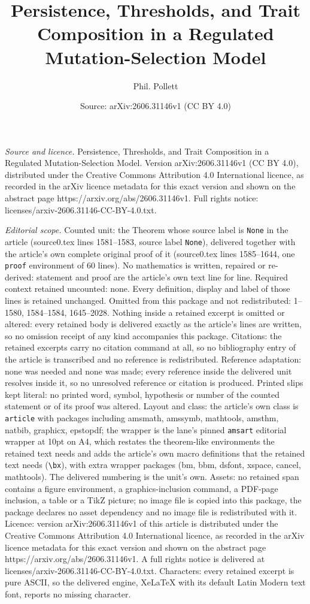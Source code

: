 \documentclass[10pt,a4paper]{amsart}
\title[Persistence, Thresholds, and Trait Composition in a Regulate]{Persistence, Thresholds, and Trait Composition in a Regulated Mutation-Selection Model}
\author{Phil. Pollett}
\date{Source: arXiv:2606.31146v1 (CC BY 4.0)}
\begin{document}
\maketitle

\noindent\emph{Source and licence.} Persistence, Thresholds, and Trait Composition in a Regulated Mutation-Selection Model. Version arXiv:2606.31146v1 (CC BY 4.0), distributed under the Creative Commons Attribution 4.0 International licence, as recorded in the arXiv licence metadata for this exact version and shown on the abstract page https://arxiv.org/abs/2606.31146v1. Full rights notice: licenses/arxiv-2606.31146-CC-BY-4.0.txt.\par\smallskip

\noindent\textit{Editorial scope.} Counted unit: the Theorem whose source label is \texttt{None} in the article (source0.tex lines 1581--1583, source label \texttt{None}), delivered together with the article's own complete original proof of it (source0.tex lines 1585--1644, one \texttt{proof} environment of 60 lines). No mathematics is written, repaired or re-derived: statement and proof are the article's own text line for line. Required context retained uncounted: none. Every definition, display and label of those lines is retained unchanged. Omitted from this package and not redistributed: 1--1580, 1584--1584, 1645--2028. Nothing inside a retained excerpt is omitted or altered: every retained body is delivered exactly as the article's lines are written, so no omission receipt of any kind accompanies this package. Citations: the retained excerpts carry no citation command at all, so no bibliography entry of the article is transcribed and no reference is redistributed. Reference adaptation: none was needed and none was made; every reference inside the delivered unit resolves inside it, so no unresolved reference or citation is produced. Printed slips kept literal: no printed word, symbol, hypothesis or number of the counted statement or of its proof was altered. Layout and class: the article's own class is \texttt{article} with packages including amsmath, amssymb, mathtools, amsthm, natbib, graphicx, epstopdf; the wrapper is the lane's pinned \texttt{amsart} editorial wrapper at 10pt on A4, which restates the theorem-like environments the retained text needs and adds the article's own macro definitions that the retained text needs (\texttt{\textbackslash bx}), with extra wrapper packages (bm, bbm, dsfont, xspace, cancel, mathtools). The delivered numbering is the unit's own. Assets: no retained span contains a figure environment, a graphics-inclusion command, a PDF-page inclusion, a table or a TikZ picture; no image file is copied into this package, the package declares no asset dependency and no image file is redistributed with it. Licence: version arXiv:2606.31146v1 of this article is distributed under the Creative Commons Attribution 4.0 International licence, as recorded in the arXiv licence metadata for this exact version and shown on the abstract page https://arxiv.org/abs/2606.31146v1. A full rights notice is delivered at licenses/arxiv-2606.31146-CC-BY-4.0.txt. Characters: every retained excerpt is pure ASCII, so the delivered engine, XeLaTeX with its default Latin Modern text font, reports no missing character.
\end{document}

